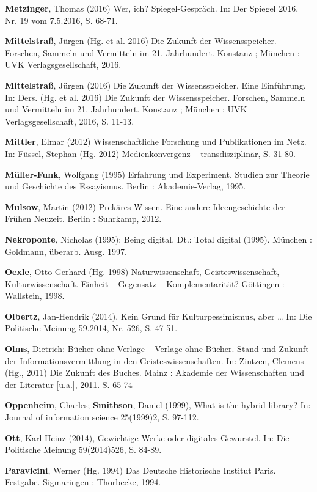 \documentclass[a4paper,
fontsize=11pt,
oneside,
numbers=noperiodatend,
parskip=half-,
bibliography=totoc,
final
]{scrartcl}
\begin{document}
\textbf{Metzinger}, Thomas (2016) Wer, ich? Spiegel-Gespräch. In: Der
Spiegel 2016, Nr. 19 vom 7.5.2016, S. 68-71.

\textbf{Mittelstraß}, Jürgen (Hg. et al. 2016) Die Zukunft der
Wissensspeicher. Forschen, Sammeln und Vermitteln im 21. Jahrhundert.
Konstanz ; München : UVK Verlagsgesellschaft, 2016.

\textbf{Mittelstraß}, Jürgen (2016) Die Zukunft der Wissensspeicher.
Eine Einführung. In: Ders. (Hg. et al. 2016) Die Zukunft der
Wissensspeicher. Forschen, Sammeln und Vermitteln im 21. Jahrhundert.
Konstanz ; München : UVK Verlagsgesellschaft, 2016, S. 11-13.

\textbf{Mittler}, Elmar (2012) Wissenschaftliche Forschung und
Publikationen im Netz. In: Füssel, Stephan (Hg. 2012) Medienkonvergenz
-- transdisziplinär, S. 31-80.

\textbf{Müller-Funk}, Wolfgang (1995) Erfahrung und Experiment. Studien
zur Theorie und Geschichte des Essayismus. Berlin : Akademie-Verlag,
1995.

\textbf{Mulsow}, Martin (2012) Prekäres Wissen. Eine andere
Ideengeschichte der Frühen Neuzeit. Berlin : Suhrkamp, 2012.

\textbf{Nekroponte}, Nicholas (1995): Being digital. Dt.: Total digital
(1995). München : Goldmann, überarb. Ausg. 1997.

\textbf{Oexle}, Otto Gerhard (Hg. 1998) Naturwissenschaft,
Geisteswissenschaft, Kulturwissenschaft. Einheit -- Gegensatz --
Komplementarität? Göttingen : Wallstein, 1998.

\textbf{Olbertz}, Jan-Hendrik (2014), Kein Grund für Kulturpessimismus,
aber \ldots{} In: Die Politische Meinung 59.2014, Nr. 526, S. 47-51.

\textbf{Olms}, Dietrich: Bücher ohne Verlage -- Verlage ohne Bücher.
Stand und Zukunft der Informationsvermittlung in den
Geisteswissenschaften. In: Zintzen, Clemens (Hg., 2011) Die Zukunft des
Buches. Mainz : Akademie der Wissenschaften und der Literatur
{[}u.a.{]}, 2011. S. 65-74

\textbf{Oppenheim}, Charles; \textbf{Smithson}, Daniel (1999), What is
the hybrid library? In: Journal of information science 25(1999)2, S.
97-112.

\textbf{Ott}, Karl-Heinz (2014), Gewichtige Werke oder digitales
Gewurstel. In: Die Politische Meinung 59(2014)526, S. 84-89.

\textbf{Paravicini}, Werner (Hg. 1994) Das Deutsche Historische Institut
Paris. Festgabe. Sigmaringen : Thorbecke, 1994.
\end{document}
